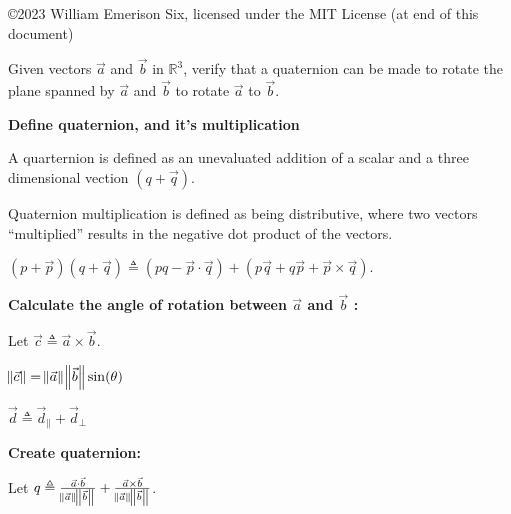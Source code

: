 \documentclass[12pt]{article}
\newcommand{\R}{\mathbb{R}}
\newenvironment{problem}[2][Problem]{\begin{trivlist}
\item[\hskip \labelsep {\bfseries #1}\hskip \labelsep {\bfseries #2.}]}{\end{trivlist}}
\begin{document}

\rhead{\today}


\copyright 2023 William Emerison Six, licensed under the MIT License (at end of this document)

\begin{problem}{1} %

  Given vectors $\vec{a}$ and $\vec{b}$ in $\R^3$, verify that a quaternion can be made to rotate the plane
  spanned by $\vec{a}$ and $\vec{b}$ to rotate $\vec{a}$ to $\vec{b}$.


\textbf{Define quaternion, and it's multiplication}

A quarternion is defined as an unevaluated addition of a scalar and a three
dimensional vection
$ (q +\vec{q})$.

Quaternion multiplication is defined as being distributive, where two vectors
``multiplied'' results in the negative dot product of the vectors.


   $ (p +\vec{p})(q + \vec{q}) \triangleq (pq - \vec{p} \cdot \vec{q}) + (p\vec{q} + q\vec{p} + \vec{p} \times \vec{q}) $.


\textbf{Calculate the angle of rotation between $\vec{a}$ and $\vec{b}$ : }

  Let $\vec{c} \triangleq \vec{a} \times \vec{b}$.

  $\norm{\vec{c}} = \norm{\vec{a}}\norm{\vec{b}}\sin(\theta) $

  $\vec{d} \triangleq  \vec{d}_{\parallel} + \vec{d}_{\perp}$


\textbf{Create quaternion: }

  Let $q  \triangleq \frac{\vec{a} \cdot \vec{b}}{\norm{\vec{a}}\norm{\vec{b}}} + \frac{\vec{a} \times \vec{b}}{\norm{\vec{a}}\norm{\vec{b}}}  $.

\end{problem}
\end{document}
